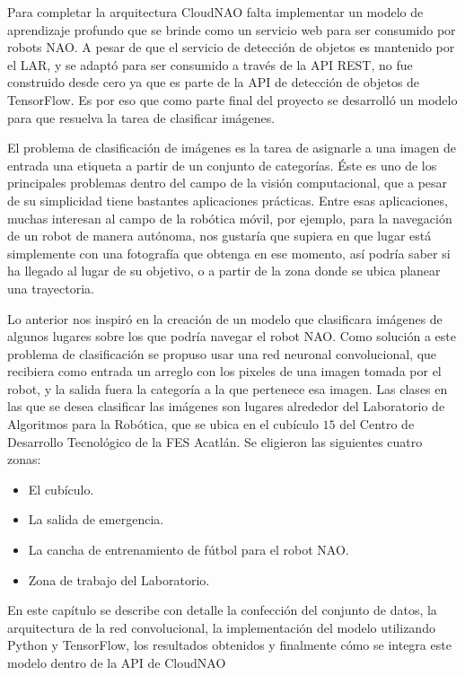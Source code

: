 %
%

Para completar la arquitectura CloudNAO falta implementar un modelo de aprendizaje 
profundo que se brinde como un servicio web para ser consumido por robots NAO.
A pesar de que el servicio de detección de objetos es mantenido por el LAR, y 
se adaptó para ser consumido a través de la API REST, no fue construido
desde cero ya que es parte de la API de detección de objetos de TensorFlow.
Es por eso que como parte final del proyecto se desarrolló un modelo para que 
resuelva la tarea de clasificar imágenes.

El problema de clasificación de imágenes es la tarea de asignarle a una imagen de
entrada una etiqueta a partir de un conjunto de categorías. Éste es uno de los principales
problemas dentro del campo de la visión computacional, que a pesar de su simplicidad
tiene bastantes aplicaciones prácticas. Entre esas aplicaciones, muchas interesan al
campo de la robótica móvil, por ejemplo, para la navegación de un robot de manera
autónoma, nos gustaría que supiera en que lugar está simplemente con una fotografía
que obtenga en ese momento, así podría saber si ha llegado al 
lugar de su objetivo, o a partir de la zona donde se ubica planear una trayectoria.

Lo anterior nos inspiró en la creación de un modelo que clasificara imágenes
de algunos lugares sobre los que podría navegar el robot NAO. 
Como solución a este problema de clasificación se propuso usar 
una red neuronal convolucional, que recibiera como entrada un arreglo con los
pixeles de una imagen tomada por el robot, y la salida fuera la categoría
a la que pertenece esa imagen. 
Las clases en las que se desea clasificar las imágenes son lugares alrededor
del Laboratorio de Algoritmos para la Robótica, que se ubica en el cubículo $15$ del
Centro de Desarrollo Tecnológico de la FES Acatlán. Se eligieron las siguientes cuatro zonas:

\begin{itemize}
    \item El cubículo.
    \item La salida de emergencia.
    \item La cancha de entrenamiento de fútbol para el robot NAO.
    \item Zona de trabajo del Laboratorio.
\end{itemize}


En este capítulo se describe con detalle la confección del
conjunto de datos, la arquitectura de la red 
convolucional, la implementación
del modelo utilizando Python y TensorFlow, los resultados obtenidos
y finalmente cómo se integra este modelo dentro de la API de CloudNAO 

%
%